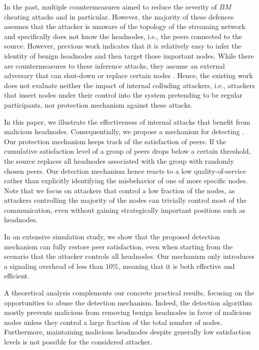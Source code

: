 In the past, multiple countermeasures aimed to reduce the severity of $BM$ cheating attacks and \drop in particular. However, the majority of these defences \cite{zhang2005coolstreaming, defending2, antiliar} assumes that the attacker is unaware of the topology of the streaming network and specifically does not know the headnodes, i.e., the peers connected to the source. 
However, previous work indicates that it is relatively easy to infer the identity of benign headnodes and then target those important nodes. 
While there are countermeasures to these inference attacks, they assume an external adversary that can shut-down or replace certain nodes \cite{nguyen2016swap, rbcs, nguyen2014resilience}. Hence, the existing work does not evaluate neither the impact of internal colluding attackers, i.e., attackers that insert nodes under their control into the system pretending to be regular participants, nor protection mechanism against these attacks. 


In this paper, we  illustrate the effectiveness of internal attacks that benefit from malicious headnodes. 
Consequentially, we propose a mechanism for detecting \drop. Our protection mechanism keeps track of the satisfaction of peers. If the cumulative satisfaction level of a group of peers drops below a certain threshold, the source replaces all headnodes associated with the group with randomly chosen peers. Our detection mechanism hence reacts to a low quality-of-service rather than explicitly identifying the misbehavior of one of more specific nodes.
Note that we focus on attackers that control a low fraction of the nodes, as attackers controlling the majority of the nodes can trivially control most of the communication, even without gaining strategically important positions such as headnodes.    

In an extensive simulation study, we show that the proposed detection mechanism can fully restore peer satisfaction, even when starting from the scenario that  the attacker controls all headnodes. 
Our mechanism only introduces a signaling overhead of less than $10\%$, meaning that it is both effective and efficient.

A theoretical analysis complements our concrete practical results, focusing on the opportunities to abuse the detection mechanism. 
Indeed, the detection algorithm mostly prevents malicious from removing benign headnodes in favor of malicious nodes unless they control a large fraction of the total number of nodes. 
Furthermore, maintaining malicious headnodes despite generally low satisfaction levels is not possible for the considered attacker. 
  



